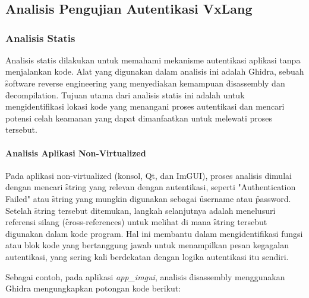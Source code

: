 \chapter{\babLima}

\section{Analisis Pengujian Autentikasi  VxLang}
\subsection{Analisis Statis}
Analisis statis dilakukan untuk memahami mekanisme autentikasi aplikasi tanpa menjalankan kode. Alat yang digunakan dalam analisis ini adalah Ghidra, sebuah \f{software reverse engineering} yang menyediakan kemampuan \f{disassembly} dan \f{decompilation}. Tujuan utama dari analisis statis ini adalah untuk mengidentifikasi lokasi kode yang menangani proses autentikasi dan mencari potensi celah keamanan yang dapat dimanfaatkan untuk melewati proses tersebut.

\subsubsection{Analisis Aplikasi Non-Virtualized}
Pada aplikasi non-virtualized (konsol, Qt, dan ImGUI), proses analisis dimulai dengan mencari \f{string} yang relevan dengan autentikasi, seperti "Authentication Failed" atau \f{string} yang mungkin digunakan sebagai \f{username} atau \f{password}. Setelah \f{string} tersebut ditemukan, langkah selanjutnya adalah menelusuri referensi silang (\f{cross-references}) untuk melihat di mana \f{string} tersebut digunakan dalam kode program. Hal ini membantu dalam mengidentifikasi fungsi atau blok kode yang bertanggung jawab untuk menampilkan pesan kegagalan autentikasi, yang sering kali berdekatan dengan logika autentikasi itu sendiri.

Sebagai contoh, pada aplikasi \textit{app\_imgui}, analisis \f{disassembly} menggunakan Ghidra mengungkapkan potongan kode berikut:

